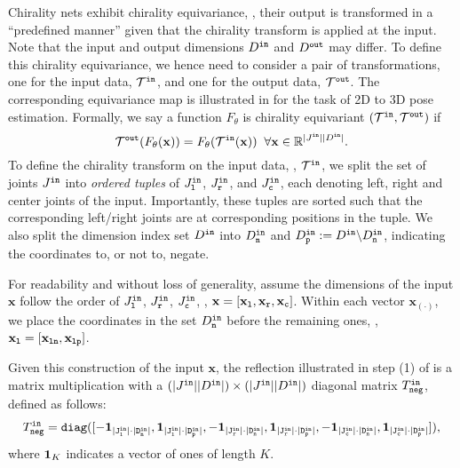 \documentclass{article}
\def\rvx{{\mathbf{x}}}
\begin{document}
Chirality nets exhibit chirality equivariance, \ie, their output is transformed in a ``predefined manner'' given that the chirality transform is applied at the input. Note that the input and output dimensions $D^{\tt in}$ and $D^{\tt out}$ may differ. To define this chirality equivariance, we hence  need to consider a pair of transformations, one for the input data, $\mathcal{T}^{\tt in}$, and one for the output data, $\mathcal{T}^{\tt out}$. The corresponding equivariance map is illustrated in  for the task of 2D to 3D pose estimation. Formally,  we say a function $F_\theta$ is chirality equivariant \wrt $(\mathcal{T^{\tt in}, T^{\tt out}})$ if 
$$\mathcal{T}^{\tt out}(F_\theta(\rvx)) = F_\theta(\mathcal{T}^{\tt in}(\rvx)) \;\; \forall \rvx \in \mathbb{R}^{|J^{\tt in}||D^{\tt in}|}.$$
To define the chirality transform on the input data, \ie, $\mathcal{T}^{\tt in}$, we split the set of joints $J^{\tt in}$ into \emph{ordered tuples} of ${J}^{\tt in}_{\tt l}$, ${J}^{\tt in}_{\tt r}$, and ${J}^{\tt in}_{\tt c}$, each denoting left, right and center joints of the input. 
Importantly, these tuples are sorted such that the corresponding left/right joints are at corresponding positions in the tuple.  We also split the dimension index set $D^{\tt in}$  into $D^{\tt in}_{\tt n}$ and $D^{\tt in}_{\tt p}:=  D^{\tt in}  \backslash D^{\tt in}_{\tt n}$,  indicating the coordinates to, or not to, negate.

For readability and without loss of generality, assume the dimensions of the input $\rvx$
follow the order of ${J}^{\tt in}_{\tt l}$, ${J}^{\tt in}_{\tt r}$, ${J}^{\tt in}_{\tt c}$, \ie,  $\rvx = [\rvx_{\tt l}, \rvx_{\tt r}, \rvx_{\tt c}]$. Within each vector $\rvx_{(\cdot)}$, we place the coordinates in the set $D^{\tt in}_{\tt n}$  before the remaining ones, \ie, $\rvx_{\tt l} = [\rvx_{\tt ln}, \rvx_{\tt lp}]$. 

Given this construction of the input $\rvx$, the reflection illustrated in step (1) of  is a matrix multiplication with a $(|{J}^{\tt in}||D^{\tt in}|) \times (|{J}^{\tt in}||D^{\tt in}|)$ diagonal matrix $T^{\tt in}_{\tt neg}$, defined as follows:
$$T_{\tt neg}^{\tt in} = {\tt diag (
[
{\bf -1}_{|{J}^{\tt in}_{\tt l}|\cdot |D^{\tt in}_{\tt n}|},  {\bf 1}_{|{J}^{\tt in}_{\tt l}|\cdot |D^{\tt in}_{\tt p}|}, 
{\bf -1}_{|{J}^{\tt in}_{\tt r}|\cdot |D^{\tt in}_{\tt n}|},  {\bf 1}_{|{J}^{\tt in}_{\tt r}|\cdot |D^{\tt in}_{\tt p}|}, 
{\bf -1}_{|{J}^{\tt in}_{\tt c}|\cdot |D^{\tt in}_{\tt n}|},  {\bf 1}_{|{J}^{\tt in}_{\tt c}|\cdot |D^{\tt in}_{\tt p}|}
])},$$
where ${\bf 1}_{K}$ indicates a vector of ones of length $K$. 
\end{document}
